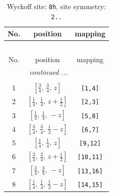 \documentclass[fleqn,8pt]{jsarticle}
\begin{document}
\begin{longtable}{ccc}
\caption{Wyckoff site: {\tt 8h}, site symmetry: {\tt 2..}}
 \\
 \hline \hline
No. & position & mapping \\ \hline \endfirsthead

\multicolumn{2}{l}{\tablename\ \thetable{}} \\
 \hline \hline
No. & position & mapping \\ \hline \endhead

 \hline \hline
\multicolumn{2}{r}{\footnotesize\it continued ...} \\ \endfoot

 \hline \hline
\multicolumn{2}{r}{} \\ \endlastfoot

1 & $\left[ \frac{3}{4},\, \frac{3}{4},\, z \right]$ & {\tt [1,4]} \\ \hline
2 & $\left[ \frac{1}{4},\, \frac{1}{4},\, z + \frac{1}{2} \right]$ & {\tt [2,3]} \\ \hline
3 & $\left[ \frac{1}{4},\, \frac{1}{4},\, - z \right]$ & {\tt [5,8]} \\ \hline
4 & $\left[ \frac{3}{4},\, \frac{3}{4},\, \frac{1}{2} - z \right]$ & {\tt [6,7]} \\ \hline
5 & $\left[ \frac{1}{4},\, \frac{1}{4},\, z \right]$ & {\tt [9,12]} \\ \hline
6 & $\left[ \frac{3}{4},\, \frac{3}{4},\, z + \frac{1}{2} \right]$ & {\tt [10,11]} \\ \hline
7 & $\left[ \frac{3}{4},\, \frac{3}{4},\, - z \right]$ & {\tt [13,16]} \\ \hline
8 & $\left[ \frac{1}{4},\, \frac{1}{4},\, \frac{1}{2} - z \right]$ & {\tt [14,15]} \\
\end{longtable}
\renewcommand{\arraystretch}{1.2}
\end{document}
